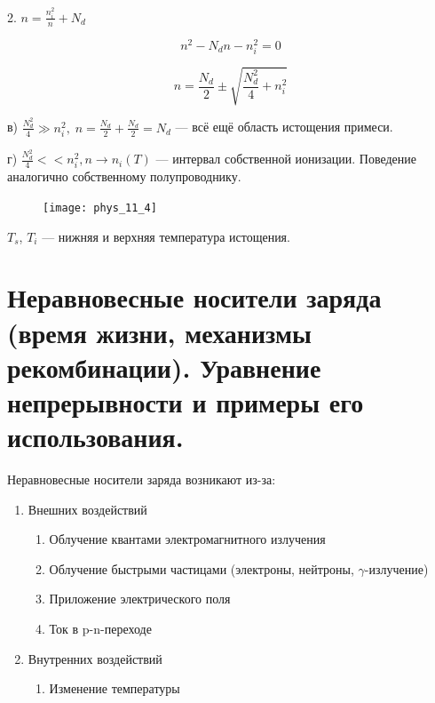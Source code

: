 \vspace{2cm}

2. $\displaystyle n=\frac{n_i^2}{n}+N_d$

\vspace{0.5cm}

$$
n^2-N_d n-n_i^2=0
$$

$$
n=\frac{N_d}{2} \pm \sqrt{\frac{N_d^2}{4}+n_i^2}
$$

\vspace{2cm}
в) $\displaystyle \frac{N_d^2}{4} \gg n_i^2, \; n=\frac{N_d}{2}+\frac{N_d}{2}=N_d$ --- всё ещё область истощения примеси.

\vspace{2cm}
г) $\displaystyle \frac{N_d^2}{4}<<n_i^2, n \rightarrow n_i(T)$ --- интервал собственной ионизации. Поведение аналогично собственному полупроводнику.
\vspace{0.5cm}

\begin{figure}[h!]
    \centering
    \texttt{[image: phys\_11\_4]}
\end{figure}


\begin{figure}[h!]
    \centering
\end{figure}

$T_s$, $T_i$ --- нижняя и верхняя температура истощения.
\clearpage

\section{Неравновесные носители заряда (время жизни, механизмы рекомбинации). Уравнение непрерывности и примеры его использования.}

Неравновесные носители заряда возникают из-за:

\begin{enumerate}
    \item Внешних воздействий 
    \begin{enumerate}
        \item Облучение квантами электромагнитного излучения
        \item Облучение быстрыми частицами (электроны, нейтроны, $\gamma$-излучение)
        \item Приложение электрического поля 
        \item Ток в p-n-переходе
    \end{enumerate}
    \item Внутренних воздействий
    \begin{enumerate}
        \item Изменение температуры
    \end{enumerate}
\end{enumerate}


